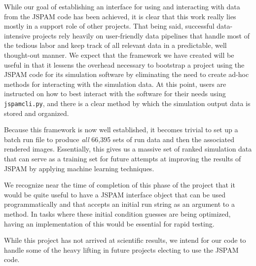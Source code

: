 While our goal of establishing an interface for using and
interacting with data from the JSPAM code has been achieved,
it is clear that this work really lies mostly in a support role of other
projects. That being said, successful data-intensive projects rely heavily on
user-friendly data pipelines that handle most of the tedious labor and keep
track of all relevant data in a predictable, well thought-out manner.
We expect that the framework
we have created will be useful in that it lessens the overhead necessary to
bootstrap a project using the JSPAM code for its simulation software by
eliminating the need to create ad-hoc methods for interacting with the
simulation data. At this point, users are instructed on how to best interact
with the software for their needs using \texttt{jspamcli.py}, and there is a
clear method by which the simulation output data is stored and organized.

Because this framework is now well established, it becomes trivial to set
up a batch
run file to produce \textit{all} 66,395 sets of run data and then the
associated rendered images.
Essentially, this gives us a massive set of ranked simulation data that
can serve as a training set for future attempts at improving the results of
JSPAM by applying machine learning techniques.

We recognize near the time of completion of this phase of the project that it
would be quite useful to have a JSPAM interface object that can be used
programmatically and that accepts an initial run string as an argument to a
 method. In tasks where these initial condition guesses are being
optimized, having an implementation of this would be essential for rapid
testing.

While this project has not arrived at scientific results, we intend for our
code to handle some of the
heavy lifting in future projects electing to use the JSPAM code.
